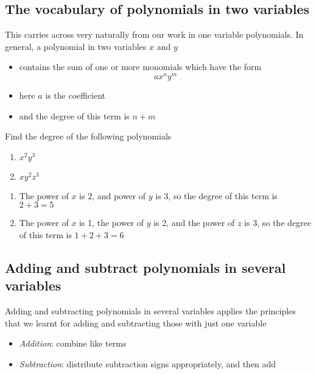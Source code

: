 \subsection{The vocabulary of polynomials in two variables}
This carries across very naturally from our work in one variable polynomials. In general, a polynomial in two variables
$x$ and $y$

\begin{itemize}
	\item contains the sum of one or more monomials which have the form
	\[
		a x^n y^m
	\]
	\item here $a$ is the \gls{coefficient}
	\item and the \gls{degree} of this term is $n+m$
\end{itemize} 

\begin{myexample}
Find the degree of the following polynomials
\begin{multicols}{2}
	\begin{enumerate}
		\item $x^2y^3$
		\item $xy^2z^3$
	\end{enumerate} 
\end{multicols}
\end{myexample}
\begin{myProof}
	\begin{enumerate}
		\item The power of $x$ is 2, and power of $y$ is 3, so the degree of this term is $2+3=5$
		\item The power of $x$ is 1, the power of $y$ is 2, and the power of $z$ is 3, so the degree of this term
		is $1+2+3=6$
	\end{enumerate}	
\end{myProof} 


\subsection{Adding and subtract polynomials in several variables}
Adding and subtracting polynomials in several variables applies the principles that we learnt for adding and subtracting those
with just one variable
\begin{itemize}
	\item {\em Addition}: combine like terms
	\item {\em Subtraction}: distribute subtraction signs appropriately, and then add
\end{itemize} 

